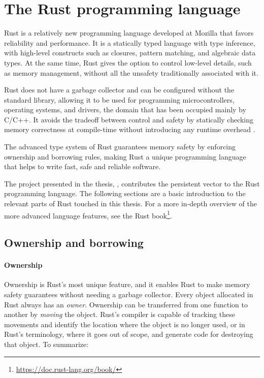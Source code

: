 \section{The Rust programming language}
\label{sec:rust}

Rust is a relatively new programming language developed at Mozilla that favors reliability and performance. It is a statically typed language with type inference, with high-level constructs such as closures, pattern matching, and algebraic data types. At the same time, Rust gives the option to control low-level details, such as memory management, without all the unsafety traditionally associated with it.

Rust does not have a garbage collector and can be configured without the standard library, allowing it to be used for programming microcontrollers, operating systems, and drivers, the domain that has been occupied mainly by C/C++. It avoids the tradeoff between control and safety by statically checking memory correctness at compile-time without introducing any runtime overhead \cite{reed-patina}.

The advanced type system of Rust guarantees memory safety by enforcing ownership and borrowing rules, making Rust a unique programming language that helps to write fast, safe and reliable software.

The project presented in the thesis, \pvecrs{}, contributes the persistent vector to the Rust programming language. The following sections are a basic introduction to the relevant parts of Rust touched in this thesis. For a more in-depth overview of the more advanced language features, see the Rust book\footnote{\url{https://doc.rust-lang.org/book/}}.

\subsection{Ownership and borrowing}

\paragraph{Ownership}
Ownership is Rust's most unique feature, and it enables Rust to make memory safety guarantees without needing a garbage collector. Every object allocated in Rust always has an \emph{owner}. Ownership can be transferred from one function to another by \emph{moving} the object. Rust's compiler is capable of tracking these movements and identify the location where the object is no longer used, or in Rust's terminology, where it goes out of scope, and generate code for destroying that object. To summarize:

